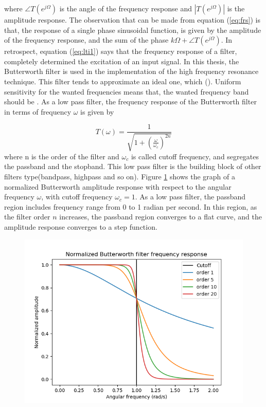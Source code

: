 \documentclass[../Main/thesis.tex]{subfiles}
\begin{document}
where $\angle T\left(e^{j\Omega}\right)$ is the angle of the frequency response  and $\left\vert T\left(e^{j\Omega}\right)\right\vert$ is the amplitude response. The observation that can be  made from equation (\ref{eq:frs}) is that, the response of a single phase sinusoidal function, is given by the amplitude of the frequency response, and the sum of the phase $k\Omega  + \angle T\left(e^{j\Omega}\right)$. In retrospect, equation (\ref{eq:lti1}) says that the frequency response of a filter, completely determined the excitation of an input signal.
\justify
In this thesis, the Butterworth filter is used in the implementation of the high frequency resonance technique. This filter tends to approximate an ideal one, which  (\cite{butterworth1930}). Uniform sensitivity for the wanted frequencies means that, the wanted frequency band should be . As a low pass filter, the frequency response of the Butterworth filter in terms of frequency $\omega$ is given by    

\begin{equation}
	T(\omega) = \frac{1}{\sqrt{1 +\left( \frac{\omega}{\omega_{c}} \right)^{2n}}}
\end{equation}
where n is the order of the filter and $\omega_{c}$ is called cutoff frequency, and segregates the passband and the stopband. This low pass filter is the building block of other filters type(bandpass, highpass and so on). Figure \ref{fig:butterworth} shows the graph of a normalized Butterworth amplitude response with respect to the angular frequency $\omega$, with cutoff frequency $\omega_{c} = 1$. As a low pass filter, the passband region includes frequency range from 0 to 1 radian per second. In this region, as the filter order $n$ increases, the passband region converges to a flat curve, and the amplitude response converges to a step function.   

\begin{figure}[H]
	\centering
	\includegraphics[width=0.9\linewidth]{../fig/butterworth}
	\caption{}
	\label{fig:butterworth}
\end{figure}
\end{document}
